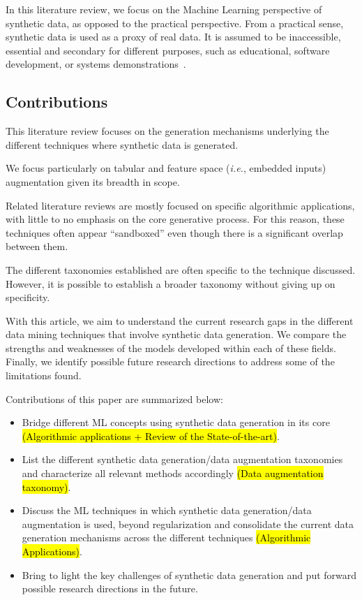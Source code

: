 \documentclass[parskip=full]{scrartcl}
\begin{document}
In this literature review, we focus on the Machine Learning perspective of
synthetic data, as opposed to the practical perspective. From a practical
sense, synthetic data is used as a proxy of real data. It is assumed to be
inaccessible, essential and secondary for different purposes, such as
educational, software development, or systems
demonstrations~\cite{mannino2019real}.

\subsection{Contributions}

This literature review focuses on the generation mechanisms underlying the
different techniques where synthetic data is generated.

We focus particularly on tabular and feature space (\textit{i.e.}, embedded
inputs) augmentation given its breadth in scope.

Related literature reviews are mostly focused on specific algorithmic
applications, with little to no emphasis on the core generative process. For
this reason, these techniques often appear ``sandboxed'' even though there is
a significant overlap between them. 

The different taxonomies established are often specific to the technique
discussed. However, it is possible to establish a broader taxonomy without
giving up on specificity.

With this article, we aim to understand the current research gaps in the
different data mining techniques that involve synthetic data generation. We
compare the strengths and weaknesses of the models developed within each of
these fields. Finally, we identify possible future research directions to
address some of the limitations found.

Contributions of this paper are summarized below:

\begin{itemize}
    \item Bridge different ML concepts using synthetic data generation in its
        core \hl{(Algorithmic applications + Review of the State-of-the-art)}.
    \item List the different synthetic data generation/data augmentation
        taxonomies and characterize all relevant methods accordingly \hl{(Data
        augmentation taxonomy)}.
    \item Discuss the ML techniques in which synthetic data generation/data augmentation is used,
        beyond regularization and consolidate the current data generation
        mechanisms across the different techniques \hl{(Algorithmic Applications)}.
    \item Bring to light the key challenges of synthetic data generation and
        put forward possible research directions in the future.
\end{itemize}
\end{document}
